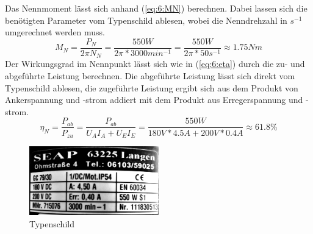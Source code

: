 \chapter{}

\section{}
Das Nennmoment lässt sich anhand (\ref{eq:6:MN}) berechnen. Dabei lassen sich die benötigten Parameter vom Typenschild ablesen, wobei die Nenndrehzahl in $ s^{-1} $ umgerechnet werden muss.
\begin{equation}
	M_{N} = \frac{P_{N}}{2\pi N_{N}} = \frac{550W}{2\pi*3000min^{-1}} = \frac{550W}{2\pi*50s^{-1}} \approx 1.75Nm
	\label{eq:6:MN}
\end{equation}
Der Wirkungsgrad im Nennpunkt lässt sich wie in (\ref{eq:6:eta}) durch die zu- und abgeführte Leistung berechnen. Die abgeführte Leistung lässt sich direkt vom Typenschild ablesen, die zugeführte Leistung ergibt sich aus dem Produkt von Ankerspannung und -strom addiert mit dem Produkt aus Erregerspannung und -strom.
\begin{equation}
	\eta_{N} = \frac{P_{ab}}{P_{zu}} = \frac{P_{ab}}{U_{A}I_{A}+U_{E}I_{E}} = \frac{550W}{180V*4.5A + 200V*0.4A} \approx 61.8\%
	\label{eq:6:eta}
\end{equation}

\begin{figure}[h]
	\centering
	\includegraphics[width=0.5\textwidth]{./bilder/typenschild.jpg}
	\caption{Typenschild}
	\label{fig:typenschild der Gleichstrommaschine}
\end{figure}